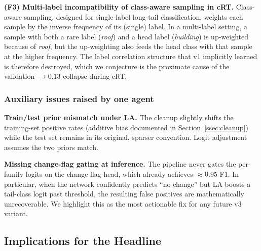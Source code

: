 \documentclass[journal]{IEEEtran}
\begin{document}
\textbf{(F3) Multi-label incompatibility of class-aware sampling in cRT.} Class-aware sampling, designed for single-label long-tail classification, weights each sample by the inverse frequency of its (single) label. In a multi-label setting, a sample with both a rare label (\emph{roof}) and a head label (\emph{building}) is up-weighted because of \emph{roof}, but the up-weighting also feeds the head class with that sample at the higher frequency. The label correlation structure that v1 implicitly learned is therefore destroyed, which we conjecture is the proximate cause of the validation $\to 0.13$ collapse during cRT.

\subsubsection*{Auxiliary issues raised by one agent}
\textbf{Train/test prior mismatch under LA.} The cleanup slightly shifts the training-set positive rates (additive bias documented in Section~\ref{ssec:cleanup}) while the test set remains in its original, sparser convention. Logit adjustment assumes the two priors match.

\textbf{Missing change-flag gating at inference.} The pipeline never gates the per-family logits on the change-flag head, which already achieves $\approx 0.95$ F1. In particular, when the network confidently predicts ``no change'' but LA boosts a tail-class logit past threshold, the resulting false positives are mathematically unrecoverable. We highlight this as the most actionable fix for any future v3 variant.

\subsection{Implications for the Headline}\label{ssec:implications}
\end{document}
